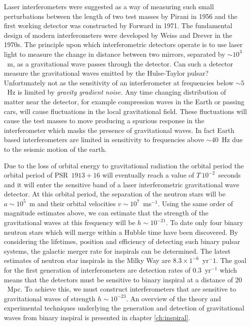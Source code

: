 Laser interferometers were suggested as a way of measuring such small
perturbations between the length of two test masses by Pirani in
1956\cite{Pirani:1956} and the first working detector was constructed by
Forward in 1971\cite{Forward:1971}. The fundamental design of modern
interferometers were developed by Weiss\cite{Weiss:1972} and
Drever\cite{Drever:1980} in the 1970s. The principle upon which
interferometric detectors operate is to use laser light to measure the change
in distance between two mirrors, separated by $\sim 10^{3}$~m, as a
gravitational wave passes through the detector. Can such a detector measure
the gravitational waves emitted by the Hulse-Taylor pulsar? Unfortunately not
as the sensitivity of an interferometer at frequencies below $\sim 5$~Hz is
limited by \emph{gravity gradient noise.} Any time changing distribution of
matter near the detector, for example compression waves in the Earth or
passing cars, will cause fluctuations in the local gravitational field. These
fluctuations will cause the test masses to move producing a spurious response
in the interferometer which masks the presence of gravitational waves. In
fact Earth based interferometers are limited in sensitivity to frequencies
above $\sim 40$~Hz due to the seismic motion of the earth.

Due to the loss of orbital energy to gravitational radiation the orbital
period the orbital period of PSR~$1913+16$ will eventually reach a value of
$T~10^{-2}$~seconds and it will enter the sensitive band of a laser
interferometric gravitational wave detector. At this orbital period, the
separation of the neutron stars will be $a \sim 10^5$~m and their orbital velocities
$v \sim 10^7$~ms$^{-1}$. Using the same order of magnitude estimates above, we
can estimate that the strength of the gravitational waves at this frequency
will be $h \sim 10^{-21}$. To date only four binary neutron stars which will
merge within a Hubble time have been discovered.  By considering the
lifetimes, position and efficiency of detecting such binary pulsar systems,
the galactic merger rate for inspirals can be determined\cite{Phinney:1991ei}.
The latest estimates of neutron star inspirals in the Milky Way are $8.3
\times 1^{-6}$~yr$^-1$. The goal for the first generation of interferometers
are detection rates of $0.3$~yr$^{-1}$ which means that the detectors must be
sensitive to binary inspiral at a distance of $20$~Mpc. To achieve this, we
must construct interferometers that are sensitive to gravitational waves of
strength $h \sim 10^{-23}$. An overview of the theory and experimental
techniques underlying the generation and detection of gravitational waves from
binary inspiral is presented in chapter \ref{ch:inspiral}.

